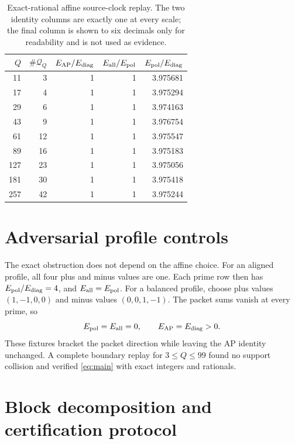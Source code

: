 \documentclass[11pt]{article}
\begin{document}
\begin{table}[t]
\centering
\caption{Exact-rational affine source-clock replay.  The two identity columns
are exactly one at every scale; the final column is shown to six decimals only
for readability and is not used as evidence.}
\label{tab:affine}
\begin{tabular}{rrrrr}
\toprule
\(Q\) & \(\#\mathcal Q_Q\) & \(E_{\rm AP}/E_{\rm diag}\)
 & \(E_{\rm all}/E_{\rm pol}\) & \(E_{\rm pol}/E_{\rm diag}\)\\
\midrule
11  & 3  & 1 & 1 & 3.975681\\
17  & 4  & 1 & 1 & 3.975294\\
29  & 6  & 1 & 1 & 3.974163\\
43  & 9  & 1 & 1 & 3.976754\\
61  & 12 & 1 & 1 & 3.975547\\
89  & 16 & 1 & 1 & 3.975183\\
127 & 23 & 1 & 1 & 3.975056\\
181 & 30 & 1 & 1 & 3.975418\\
257 & 42 & 1 & 1 & 3.975244\\
\bottomrule
\end{tabular}
\end{table}

\section{Adversarial profile controls}

The exact obstruction does not depend on the affine choice.  For an aligned
profile, all four plus and minus values are one.  Each prime row then has
\(E_{\rm pol}/E_{\rm diag}=4\), and \(E_{\rm all}=E_{\rm pol}\).  For a
balanced profile, choose plus values \((1,-1,0,0)\) and minus values
\((0,0,1,-1)\).  The packet sums vanish at every prime, so
\begin{equation}
 E_{\rm pol}=E_{\rm all}=0,\qquad E_{\rm AP}=E_{\rm diag}>0.
 \label{eq:balanced}
\end{equation}
These fixtures bracket the packet direction while leaving the AP identity
unchanged.  A complete boundary replay for \(3\leq Q\leq99\) found no
support collision and verified \eqref{eq:main} with exact integers and
rationals.

\section{Block decomposition and certification protocol}
\end{document}
